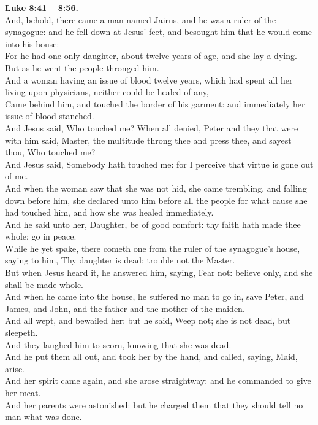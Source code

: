 \documentclass[10pt]{article} %
\begin{document}
{\begin{minipage}[t]{0.45\textwidth}
\textbf{Luke 8:41 -- 8:56.}\\
And, behold, there came a man named Jairus, and he was a ruler of the synagogue: and he fell down at Jesus' feet, and besought him that he would come into his house:\\
For he had one only daughter, about twelve years of age, and she lay a dying. But as he went the people thronged him.\\
And a woman having an issue of blood twelve years, which had spent all her living upon physicians, neither could be healed of any,\\
Came behind him, and touched the border of his garment: and immediately her issue of blood stanched.\\
And Jesus said, Who touched me? When all denied, Peter and they that were with him said, Master, the multitude throng thee and press thee, and sayest thou, Who touched me?\\
And Jesus said, Somebody hath touched me: for I perceive that virtue is gone out of me.\\
And when the woman saw that she was not hid, she came trembling, and falling down before him, she declared unto him before all the people for what cause she had touched him, and how she was healed immediately.\\
And he said unto her, Daughter, be of good comfort: thy faith hath made thee whole; go in peace.\\
While he yet spake, there cometh one from the ruler of the synagogue's house, saying to him, Thy daughter is dead; trouble not the Master.\\
But when Jesus heard it, he answered him, saying, Fear not: believe only, and she shall be made whole.\\
And when he came into the house, he suffered no man to go in, save Peter, and James, and John, and the father and the mother of the maiden.\\
And all wept, and bewailed her: but he said, Weep not; she is not dead, but sleepeth.\\
And they laughed him to scorn, knowing that she was dead.\\
And he put them all out, and took her by the hand, and called, saying, Maid, arise.\\
And her spirit came again, and she arose straightway: and he commanded to give her meat.\\
And her parents were astonished: but he charged them that they should tell no man what was done.\\
\end{minipage}}
\end{document}
